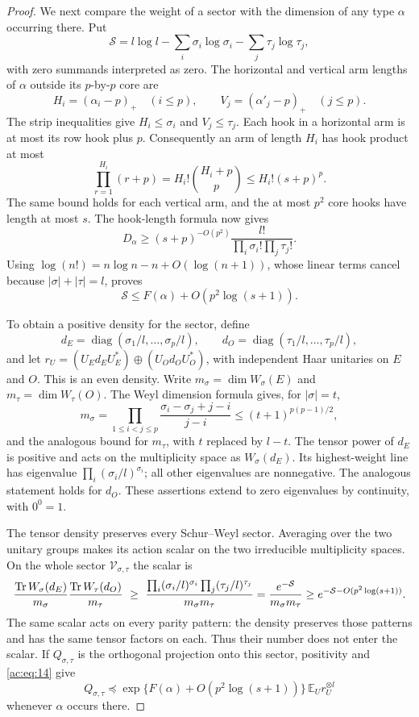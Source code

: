 \begin{proof}
We next compare the weight of a sector with the dimension of any type
\(\alpha\) occurring there. Put
\[
 \mathcal S=l\log l-\sum_i\sigma_i\log\sigma_i-\sum_j\tau_j\log\tau_j,
\]
with zero summands interpreted as zero. The horizontal and vertical arm
lengths of \(\alpha\) outside its \(p\)-by-\(p\) core are
\[
 H_i=(\alpha_i-p)_+\quad(i\le p),\qquad
 V_j=(\alpha'_j-p)_+\quad(j\le p).
\]
The strip inequalities give \(H_i\le\sigma_i\) and \(V_j\le\tau_j\).
Each hook in a horizontal arm is at most its row hook plus \(p\).
Consequently an arm of length \(H_i\) has hook product at most
\[
 \prod_{r=1}^{H_i}(r+p)
 =H_i!\binom{H_i+p}{p}
 \le H_i!(s+p)^p.
\]
The same bound holds for each vertical arm, and the at most \(p^2\) core
hooks have length at most \(s\). The hook-length formula now gives
\[
 D_\alpha\ge(s+p)^{-O(p^2)}
       \frac{l!}{\prod_i\sigma_i!\prod_j\tau_j!}.
\]
Using \(\log(n!)=n\log n-n+O(\log(n+1))\), whose linear terms cancel
because \(|\sigma|+|\tau|=l\), proves
\begin{equation}
 \mathcal S\le F(\alpha)+O(p^2\log(s+1)).
 \label{ac:eq:14}
\end{equation}

To obtain a positive density for the sector, define
\[
 d_E=\operatorname{diag}(\sigma_1/l,\ldots,\sigma_p/l),\qquad
 d_O=\operatorname{diag}(\tau_1/l,\ldots,\tau_p/l),
\]
and let \(r_U=(U_Ed_EU_E^*)\oplus(U_Od_OU_O^*)\), with independent Haar
unitaries on \(E\) and \(O\). This is an even density. Write
\(m_\sigma=\dim W_\sigma(E)\) and \(m_\tau=\dim W_\tau(O)\). The Weyl
dimension formula gives, for \(|\sigma|=t\),
\[
 m_\sigma
 =\prod_{1\le i<j\le p}
       \frac{\sigma_i-\sigma_j+j-i}{j-i}
 \le(t+1)^{p(p-1)/2},
\]
and the analogous bound for \(m_\tau\), with \(t\) replaced by \(l-t\).
The tensor power of \(d_E\) is positive and acts on the multiplicity
space as \(W_\sigma(d_E)\). Its highest-weight line has eigenvalue
\(\prod_i(\sigma_i/l)^{\sigma_i}\); all other eigenvalues are
nonnegative. The analogous statement holds for \(d_O\). These assertions
extend to zero eigenvalues by continuity, with \(0^0=1\).

The tensor density preserves every Schur--Weyl sector. Averaging over the
two unitary groups makes its action scalar on the two irreducible
multiplicity spaces. On the whole sector \(\mathcal V_{\sigma,\tau}\) the
scalar is
\[
 \frac{\operatorname{Tr} W_\sigma(d_E)}{m_\sigma}
 \frac{\operatorname{Tr} W_\tau(d_O)}{m_\tau}
 \ \ge\
 \frac{\prod_i(\sigma_i/l)^{\sigma_i}
       \prod_j(\tau_j/l)^{\tau_j}}{m_\sigma m_\tau}
 =\frac{e^{-\mathcal S}}{m_\sigma m_\tau}
 \ge e^{-\mathcal S-O(p^2\log(s+1))}.
\]
The same scalar acts on every parity pattern: the density preserves those
patterns and has the same tensor factors on each. Thus their number does
not enter the scalar. If \(Q_{\sigma,\tau}\) is the orthogonal projection
onto this sector, positivity and \eqref{ac:eq:14} give
\[
 Q_{\sigma,\tau}\preceq
 \exp\{F(\alpha)+O(p^2\log(s+1))\}\,\mathbb E_U r_U^{\otimes l}
\]
whenever \(\alpha\) occurs there.


\end{proof}
